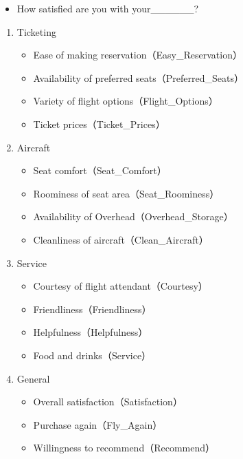 \documentclass[]{book}
\providecommand{\tightlist}{%
  \setlength{\itemsep}{0pt}\setlength{\parskip}{0pt}}
\theoremstyle{definition}
\theoremstyle{definition}
\theoremstyle{remark}
\begin{document}
\begin{itemize}
\tightlist
\item
  How satisfied are you with your\_\_\_\_\_\_?
\end{itemize}

\begin{enumerate}
\def\labelenumi{\arabic{enumi}.}
\tightlist
\item
  Ticketing

  \begin{itemize}
  \tightlist
  \item
    Ease of making reservation（Easy\_Reservation）
  \item
    Availability of preferred seats（Preferred\_Seats）
  \item
    Variety of flight options（Flight\_Options）
  \item
    Ticket prices（Ticket\_Prices）
  \end{itemize}
\item
  Aircraft

  \begin{itemize}
  \tightlist
  \item
    Seat comfort（Seat\_Comfort）
  \item
    Roominess of seat area（Seat\_Roominess）
  \item
    Availability of Overhead（Overhead\_Storage）
  \item
    Cleanliness of aircraft（Clean\_Aircraft）
  \end{itemize}
\item
  Service

  \begin{itemize}
  \tightlist
  \item
    Courtesy of flight attendant（Courtesy）
  \item
    Friendliness（Friendliness）
  \item
    Helpfulness（Helpfulness）
  \item
    Food and drinks（Service）
  \end{itemize}
\item
  General

  \begin{itemize}
  \tightlist
  \item
    Overall satisfaction（Satisfaction）
  \item
    Purchase again（Fly\_Again）
  \item
    Willingness to recommend（Recommend）
  \end{itemize}
\end{enumerate}
\end{document}
